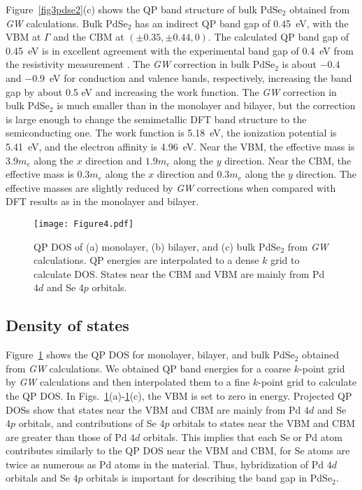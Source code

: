 \documentclass[aps,prb,longbibliography,twocolumn]{revtex4-2}
\begin{document}
Figure~\ref{fig3pdse2}(c) shows the QP band structure of bulk PdSe$_2$ obtained from 
{\em GW} calculations.
Bulk PdSe$_2$ has an indirect QP band gap of 0.45~eV,
with the VBM at $\Gamma$ and the CBM at $(\pm0.35,\pm0.44,0)$.
The calculated QP band gap of 0.45~eV is in excellent agreement with the experimental band gap of 0.4~eV from the resistivity measurement \cite{Hulliger1965}.
The {\em GW} correction in bulk PdSe$_2$ is about $-0.4$ and $-0.9$~eV 
for conduction and valence bands, respectively, increasing the band gap 
by about 0.5 eV and increasing the work function.
The {\em GW} correction in bulk PdSe$_2$ is much smaller than in the monolayer and bilayer,
but the correction is large enough to change the semimetallic DFT band
structure to the semiconducting one.
The work function is 5.18~eV, the ionization potential is 5.41~eV, and the electron affinity is 4.96~eV. 
Near the VBM, the effective mass is $3.9m_e$ along the $x$ direction
and $1.9m_e$ along the $y$ direction. 
Near the CBM, the effective mass is $0.3m_e$ along the $x$ direction
and $0.3m_e$ along the $y$ direction. The effective masses are slightly reduced by {\em GW} corrections when compared with DFT results as in the monolayer and bilayer.




\begin{figure}
\texttt{[image: Figure4.pdf]}
\caption{\label{fig4pdse2}QP DOS of (a) monolayer, (b) bilayer, 
and (c) bulk PdSe$_2$ from {\em GW} calculations. 
QP energies are interpolated to a dense $k$ grid to calculate DOS.
States near the CBM and VBM are mainly from Pd $4d$ and Se $4p$ orbitals. }
\end{figure}






\subsection{Density of states}

Figure~\ref{fig4pdse2} shows the QP DOS for monolayer, bilayer, and bulk PdSe$_2$ 
obtained from {\em GW} calculations.
We obtained QP band energies for a coarse $k$-point grid by {\em GW} calculations 
and then interpolated them to a fine $k$-point grid to calculate the QP DOS.
In Figs.~\ref{fig4pdse2}(a)-\ref{fig4pdse2}(c), the VBM is set to zero in energy. 
Projected QP DOSs show that states near the VBM and CBM 
are mainly from Pd $4d$ and Se $4p$ orbitals, and contributions of Se $4p$ orbitals to states near the VBM and CBM are greater
than those of Pd $4d$ orbitals. This implies that 
each Se or Pd atom contributes similarly to the QP DOS near the VBM and CBM, 
for Se atoms are twice as numerous as Pd atoms in the material.
Thus, hybridization of Pd $4d$ orbitals and Se $4p$ orbitals is important 
for describing the band gap in PdSe$_2$. 
\end{document}
